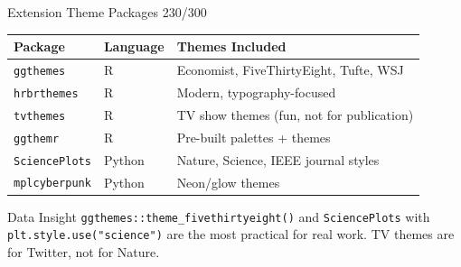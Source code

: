 \documentclass[10pt]{beamer}
\newcommand{\smark}[1]{\hfill{\scriptsize\color{codegray}#1}}
\begin{document}
\begin{frame}{Extension Theme Packages}
\smark{230/300}
\centering\small
\begin{tabular}{@{}lll@{}}
    \toprule
    \textbf{Package} & \textbf{Language} & \textbf{Themes Included} \\
    \midrule
    \texttt{ggthemes}    & R      & Economist, FiveThirtyEight, Tufte, WSJ \\
    \texttt{hrbrthemes}  & R      & Modern, typography-focused \\
    \texttt{tvthemes}    & R      & TV show themes (fun, not for publication) \\
    \texttt{ggthemr}     & R      & Pre-built palettes + themes \\
    \texttt{SciencePlots} & Python & Nature, Science, IEEE journal styles \\
    \texttt{mplcyberpunk} & Python & Neon/glow themes \\
    \bottomrule
\end{tabular}

\vspace{0.3cm}
\begin{exampleblock}{Data Insight}
    \scriptsize \texttt{ggthemes::theme\_fivethirtyeight()} and \texttt{SciencePlots} with \texttt{plt.style.use("science")} are the most practical for real work. TV themes are for Twitter, not for Nature.
\end{exampleblock}
\end{frame}
\end{document}
